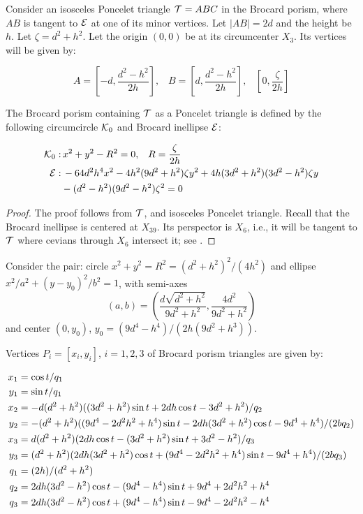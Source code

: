 Consider an isosceles Poncelet triangle $\mathcal{T}=ABC$ in the Brocard porism, where $AB$ is tangent to $\mathcal{E}$ at one of its minor vertices. Let $|AB|=2d$ and the height be $h$. Let $\zeta=d^2+h^2$. Let the origin $(0,0)$ be at its circumcenter $X_3$. Its vertices will be given by:

\[A=\left[-d ,\frac{d^2-h^2}{2h}\right], \;\;\; B= \left[d,\frac{d^2-h^2}{2h}\right], \;\;\; \left[0 ,\frac{\zeta}{2h}\right] \]


\begin{proposition}\label{prop:pair_brocard}
The Brocard porism containing $\mathcal{T}$ as a Poncelet triangle is defined by the following circumcircle $\mathcal{K}_0$ and Brocard inellipse $\mathcal{E}$:

\begin{align*}
\mathcal{K}_0:&\, x^2+y^2-R^2=0, \;\;\; R=\frac{\zeta}{2h}\\
\mathcal{E}:&\, -64d^2  h^4  x^2-4  h^2  (9  d^2+h^2)  \zeta  y^2 +4  h  (3  d^2+h^2)  (3  d^2-h^2)  \zeta  y\\&-(d^2-h^2) (9d^2 -h^2) \zeta^2=0
\end{align*}
\end{proposition}

\begin{proof}
The proof follows from $\mathcal{T}$, and isosceles Poncelet triangle. Recall that the Brocard inellipse is centered at $X_{39}$. Its perspector is $X_6$, i.e., it will be tangent to $\mathcal{T}$ where cevians through $X_6$ intersect it; see \cite[Brocard inellipse]{mw}.
\end{proof}

Consider the pair: circle $x^2+y^2=R^2=(d^2+h^2)^2/(4h^2)$ and   ellipse
$x^2/a^2+(y-y_0)^2/b^2=1$, with  semi-axes
 \[  (a,b)=\left(\frac{d\sqrt{d^2+h^2}}{9d^2+h^2},\frac{4d^2}{9d^2+h^2}\right)
    \]
and center $(0,y_0)$,  $y_0=(9d^4 - h^4)/(2h(9d^2  +  h^3))$.

Vertices $P_i=[x_i,y_i]$, $i=1,2,3$ of Brocard porism triangles are given by:

{\small  
\begin{equation}
    \aligned
    x_1 &= \cos{t}/q_1\\
    y_1 &= \sin{t}/q_1 \\
    x_2 &= -d (d^2 + h^2) ((3 d^2 + h^2)\sin{t} + 2d h \cos{t}- 3 d^2 + h^2)/q_2 \\
    y_2&=-(d^2 + h^2) ((9 d^4 - 2 d^2 h^2 + h^4)\sin{t} - 2 d h (3 d^2 + h^2)\cos{t} - 9 d^4 + h^4)/(2 b q_2) \\
    x_3 &= d (d^2 + h^2) (2 d h \cos{t} - (3 d^2 + h^2) \sin{t} + 3 d^2 - h^2)/q_3\\
    y_3 &=(d^2 + h^2) (2d h (3 d^2 + h^2) \cos{t}+ (9 d^4 - 2 d^2 h^2 + h^4)\sin{t} - 9 d^4 + h^4)/(2 b q_3) \\
    q_1&=(2h)/(d^2+h^2)\\
    q_2&= 2 d h (3 d^2 - h^2)\cos{t} - (9 d^4 - h^4) \sin{t}  + 9 d^4 + 2 d^2 h^2 + h^4\\
    q_3&= 2 d h (3 d^2 - h^2)\cos{t} + (9 d^4 - h^4)\sin{t} - 9 d^4 - 2 d^2 h^2 - h^4
\endaligned
\label{eqn:04-vertices-brocard}
\end{equation}
}



